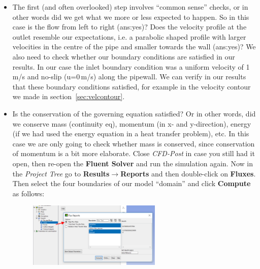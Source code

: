 \documentclass[11pt,a4paper,oneside,hidelinks]{scrartcl}
\newcommand\bfr[1]{\textcolor[rgb]{1,0.00,0.00}{\textbf{\textsf{#1}}}}
\begin{document}
\begin{itemize}
\item The first (and often overlooked) step involves ``common sense'' checks, or in other words did we get what we more or less expected to happen. So in this case is the flow from left to right (ans:yes)? Does the velocity profile at the outlet resemble our expectations, i.e. a parabolic shaped profile with larger velocities in the centre of the pipe and smaller towards the wall (ans:yes)? We also need to check whether our boundary conditions are satisfied in our results. In our case the inlet boundary condition was a uniform velocity of 1\,m/s and no-slip (u=0\,m/s) along the pipewall. We can verify in our results that these boundary conditions satisfied, for example in the velocity contour we made in section~\ref{sec:velcontour}.
\item Is the conservation of the governing equation satisfied? Or in other words, did we conserve mass (continuity eq), momentum (in x- and y-direction), energy (if we had used the energy equation in a heat transfer problem), etc. In this case we are only going to check whether mass is conserved, since conservation of momentum is a bit more elaborate. Close \emph{CFD-Post} in case you still had it open, then re-open the \bfr{Fluent Solver} and run the simulation again. Now in the \emph{Project Tree} go to \bfr{Results$\rightarrow$Reports} and then double-click on \bfr{Fluxes}. Then select the four boundaries of our model ``domain'' and click \bfr{Compute} as follows:
    \begin{figure}[H]
    \begin{center}
    \includegraphics[width=0.6\textwidth,clip]{mass_cons.png}
    \end{center}
    \end{figure}


\end{itemize}
\end{document}
